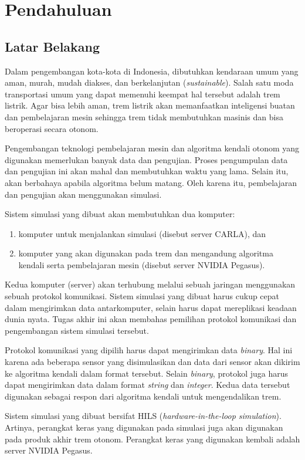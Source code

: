 \chapter{Pendahuluan}

\section{Latar Belakang}

Dalam pengembangan kota-kota di Indonesia, dibutuhkan kendaraan umum yang aman,
murah, mudah diakses, dan berkelanjutan (\textit{sustainable}). Salah satu moda
transportasi umum yang dapat memenuhi keempat hal tersebut adalah trem listrik.
Agar bisa lebih aman, trem listrik akan memanfaatkan inteligensi buatan dan
pembelajaran mesin sehingga trem tidak membutuhkan masinis dan bisa beroperasi
secara otonom.

Pengembangan teknologi pembelajaran mesin dan algoritma kendali otonom yang
digunakan memerlukan banyak data dan pengujian. Proses pengumpulan data dan
pengujian ini akan mahal dan membutuhkan waktu yang lama. Selain itu, akan
berbahaya apabila algoritma belum matang. Oleh karena itu, pembelajaran dan
pengujian akan menggunakan simulasi.

Sistem simulasi yang dibuat akan membutuhkan dua komputer:
\begin{enumerate}
	\item komputer untuk menjalankan simulasi (disebut server CARLA), dan
	\item komputer yang akan digunakan pada trem dan mengandung algoritma
	      kendali serta pembelajaran mesin (disebut server NVIDIA Pegasus).
\end{enumerate}
Kedua komputer (server) akan terhubung melalui sebuah jaringan menggunakan
sebuah protokol komunikasi. Sistem simulasi yang dibuat harus cukup cepat dalam
mengirimkan data antarkomputer, selain harus dapat mereplikasi keadaan dunia
nyata. Tugas akhir ini akan membahas pemilihan protokol komunikasi dan
pengembangan sistem simulasi tersebut.

Protokol komunikasi yang dipilih harus dapat mengirimkan data \textit{binary}.
Hal ini karena ada beberapa sensor yang disimulasikan dan data dari sensor
akan dikirim ke algoritma kendali dalam format tersebut. Selain \textit{binary},
protokol juga harus dapat mengirimkan data dalam format \textit{string} dan
\textit{integer}. Kedua data tersebut digunakan sebagai respon dari algoritma
kendali untuk mengendalikan trem.

Sistem simulasi yang dibuat bersifat HILS (\textit{hardware-in-the-loop
	simulation}).  Artinya, perangkat keras yang digunakan pada simulasi juga akan
digunakan pada produk akhir trem otonom.  Perangkat keras yang digunakan kembali
adalah server NVIDIA Pegasus.

